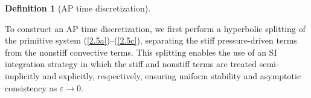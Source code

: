 \documentclass[A4paper,12pt,twoside]{article}
\newtheorem{definition}{Definition}[section]
\numberwithin{equation}{section}
\numberwithin{figure}{section}
\numberwithin{table}{section}
\newcommand{\dt}{\Delta t}
\newcommand{\ve}{\varepsilon}
\newcommand\eref[1]{(\ref{#1})}
\newcommand*\xbar[1]{%
  \hbox{%
    \vbox{%
      \hrule height 0.5pt %
      \kern0.4ex%
      \hbox{%
        \kern-0.05em%
        \ensuremath{#1}%
        \kern-0.00em%
      }%
    }%
  }%
}
\begin{document}
\begin{definition}[AP time discretization]
\end{definition}

To construct an AP time discretization, we first perform a hyperbolic splitting of the primitive system \eref{2.5a}–\eref{2.5c}, separating
the stiff pressure-driven terms from the nonstiff convective terms. This splitting enables the use of an SI integration strategy in which
the stiff and nonstiff terms are treated semi-implicitly and explicitly, respectively, ensuring uniform stability and asymptotic consistency
as $\ve\to0$.
\end{document}
